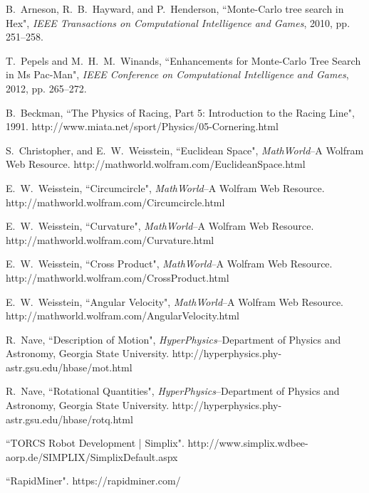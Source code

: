 \documentclass[conference]{IEEEtran}
\begin{document}
\begin{thebibliography}{22}
B.~Arneson, R.~B.~Hayward, and P.~Henderson, ``Monte-Carlo tree search in Hex", \emph{IEEE Transactions on Computational Intelligence and Games}, 2010, pp. 251--258.

T.~Pepels and M.~H.~M.~Winands, ``Enhancements for Monte-Carlo Tree Search in Ms Pac-Man", \emph{IEEE Conference on Computational Intelligence and Games}, 2012, pp. 265--272.

B.~Beckman, ``The Physics of Racing, Part 5: Introduction to the Racing Line", 1991. http://www.miata.net/sport/Physics/05-Cornering.html

S.~Christopher, and E.~W.~Weisstein, ``Euclidean Space", \emph{MathWorld}--A Wolfram Web Resource. http://mathworld.wolfram.com/EuclideanSpace.html

E.~W.~Weisstein, ``Circumcircle", \emph{MathWorld}--A Wolfram Web Resource. http://mathworld.wolfram.com/Circumcircle.html

E.~W.~Weisstein, ``Curvature", \emph{MathWorld}--A Wolfram Web Resource. http://mathworld.wolfram.com/Curvature.html

E.~W.~Weisstein, ``Cross Product", \emph{MathWorld}--A Wolfram Web Resource. http://mathworld.wolfram.com/CrossProduct.html

E.~W.~Weisstein, ``Angular Velocity", \emph{MathWorld}--A Wolfram Web Resource. http://mathworld.wolfram.com/AngularVelocity.html

R.~Nave, ``Description of Motion", \emph{HyperPhysics}--Department of Physics and Astronomy, Georgia State University. http://hyperphysics.phy-astr.gsu.edu/hbase/mot.html

R.~Nave, ``Rotational Quantities", \emph{HyperPhysics}--Department of Physics and Astronomy, Georgia State University. http://hyperphysics.phy-astr.gsu.edu/hbase/rotq.html

``TORCS Robot Development | Simplix". http://www.simplix.wdbee-aorp.de/SIMPLIX/SimplixDefault.aspx

``RapidMiner". https://rapidminer.com/
\end{thebibliography}

\newpage
\end{document}
